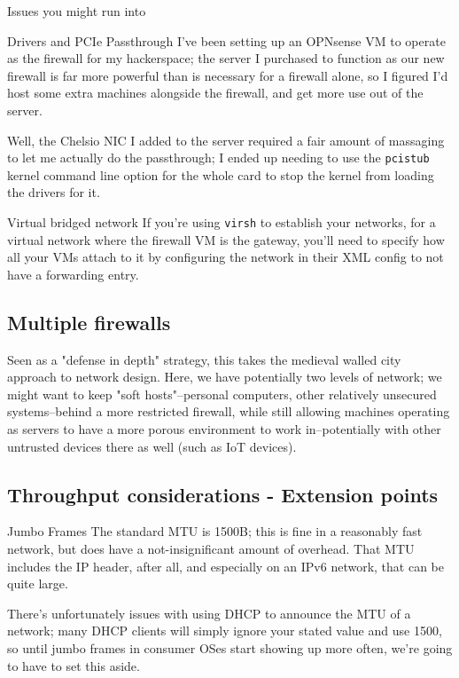 \documentclass[bigger]{beamer}
\begin{document}
\begin{frame}[fragile,label={sec:org44af7c6}]{Issues you might run into}
 \begin{block}{Drivers and PCIe Passthrough}
I've been setting up an OPNsense VM to operate as the firewall for my
hackerspace; the server I purchased to function as our new firewall is far
more powerful than is necessary for a firewall alone, so I figured I'd host
some extra machines alongside the firewall, and get more use out of the
server.

Well, the Chelsio NIC I added to the server required a fair amount of
massaging to let me actually do the passthrough; I ended up needing to
use the \texttt{pcistub} kernel command line option for the whole card to stop the
kernel from loading the drivers for it.
\end{block}

\begin{block}{Virtual bridged network}
If you're using \texttt{virsh} to establish your networks, for a virtual network where
the firewall VM is the gateway, you'll need to specify how all your VMs attach
to it by configuring the network in their XML config to not have a forwarding
entry.
\end{block}
\end{frame}

\subsection{Multiple firewalls}
\label{sec:org5849af4}
Seen as a "defense in depth" strategy, this takes the medieval walled city
approach to network design. Here, we have potentially two levels of network;
we might want to keep "soft hosts"--personal computers, other relatively
unsecured systems--behind a more restricted firewall, while still allowing
machines operating as servers to have a more porous environment to work
in--potentially with other untrusted devices there as well (such as IoT
devices).

\subsection{Throughput considerations - Extension points}
\label{sec:orgb9c111a}

\begin{frame}[label={sec:org13ce3d4}]{Jumbo Frames}
The standard MTU is 1500B; this is fine in a reasonably fast network, but does
have a not-insignificant amount of overhead. That MTU includes the IP header,
after all, and especially on an IPv6 network, that can be quite large.

There's unfortunately issues with using DHCP to announce the MTU of a network;
many DHCP clients will simply ignore your stated value and use 1500, so until
jumbo frames in consumer OSes start showing up more often, we're going to have
to set this aside.
\end{frame}
\end{document}
